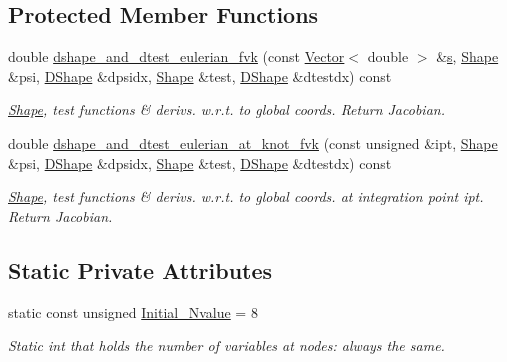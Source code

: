 \subsection*{Protected Member Functions}
\begin{DoxyCompactItemize}
\item 
double \hyperlink{classoomph_1_1QFoepplvonKarmanElement_a076f4b10ddea48722747f52e33497a8d}{dshape\+\_\+and\+\_\+dtest\+\_\+eulerian\+\_\+fvk} (const \hyperlink{classoomph_1_1Vector}{Vector}$<$ double $>$ \&\hyperlink{cfortran_8h_ab7123126e4885ef647dd9c6e3807a21c}{s}, \hyperlink{classoomph_1_1Shape}{Shape} \&psi, \hyperlink{classoomph_1_1DShape}{D\+Shape} \&dpsidx, \hyperlink{classoomph_1_1Shape}{Shape} \&test, \hyperlink{classoomph_1_1DShape}{D\+Shape} \&dtestdx) const
\begin{DoxyCompactList}\small\item\em \hyperlink{classoomph_1_1Shape}{Shape}, test functions \& derivs. w.\+r.\+t. to global coords. Return Jacobian. \end{DoxyCompactList}\item 
double \hyperlink{classoomph_1_1QFoepplvonKarmanElement_a405228612fc3349bda3cb6965b740da6}{dshape\+\_\+and\+\_\+dtest\+\_\+eulerian\+\_\+at\+\_\+knot\+\_\+fvk} (const unsigned \&ipt, \hyperlink{classoomph_1_1Shape}{Shape} \&psi, \hyperlink{classoomph_1_1DShape}{D\+Shape} \&dpsidx, \hyperlink{classoomph_1_1Shape}{Shape} \&test, \hyperlink{classoomph_1_1DShape}{D\+Shape} \&dtestdx) const
\begin{DoxyCompactList}\small\item\em \hyperlink{classoomph_1_1Shape}{Shape}, test functions \& derivs. w.\+r.\+t. to global coords. at integration point ipt. Return Jacobian. \end{DoxyCompactList}\end{DoxyCompactItemize}
\subsection*{Static Private Attributes}
\begin{DoxyCompactItemize}
\item 
static const unsigned \hyperlink{classoomph_1_1QFoepplvonKarmanElement_a5af9d6e7f38cd9a97d81cbf52f4de51a}{Initial\+\_\+\+Nvalue} = 8
\begin{DoxyCompactList}\small\item\em Static int that holds the number of variables at nodes\+: always the same. \end{DoxyCompactList}\end{DoxyCompactItemize}
